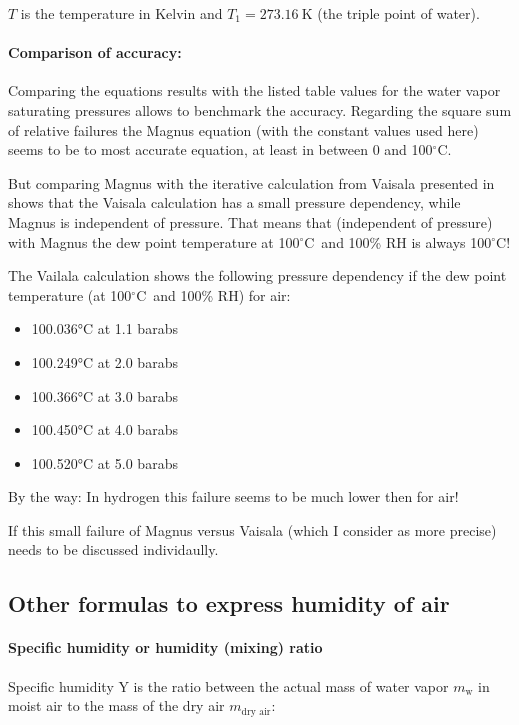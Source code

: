 \documentclass[11pt,a4paper,english,twoside]{scrreprt}
\newcommand{\gradC}{${}^\circ$C}      %
\begin{document}
$T$ is the temperature in Kelvin and $T_1 = \SI{273.16}{\kelvin}$ (the triple point of water).   

\paragraph{Comparison of accuracy:} Comparing the equations results with the listed table values for the water vapor saturating pressures allows to benchmark the accuracy. Regarding the square sum of relative failures the Magnus equation (with the constant values used here) seems to be to most accurate equation, at least in between 0 and 100\gradC. 

But comparing Magnus with the iterative calculation from Vaisala presented in \cite{lit:Vaisala} shows that the Vaisala calculation has a small pressure dependency, while Magnus is independent of pressure. That means that (independent of pressure) with Magnus the dew point temperature at 100\gradC\, and 100\% RH is always 100\gradC!

The Vailala calculation shows the following pressure dependency if the dew point temperature (at 100\gradC\, and 100\% RH) for air:

\begin{itemize}
    \item 100.036°C at 1.1 barabs
    \item 100.249°C at 2.0 barabs
    \item 100.366°C at 3.0 barabs
    \item 100.450°C at 4.0 barabs
    \item 100.520°C at 5.0 barabs
\end{itemize}

By the way: In hydrogen this failure seems to be much lower then for air!

If this small failure of Magnus versus Vaisala (which I consider as more precise) needs to be discussed individaully.

\subsection{Other formulas to express humidity of air}

\paragraph{Specific humidity or humidity (mixing) ratio}

Specific humidity Y is the ratio between the actual mass of water vapor $m_\text{w}$ in moist air to the mass of the dry air $m_\text{dry air}$:
\end{document}
